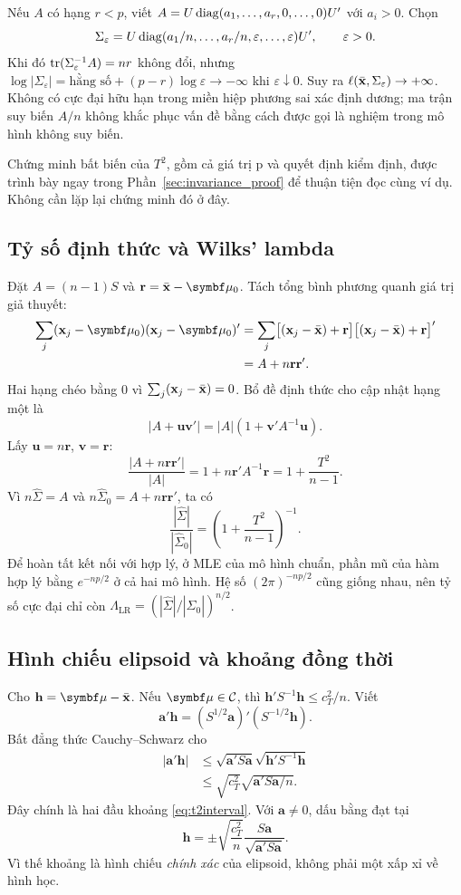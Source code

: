 Nếu $A$ có hạng $r<p$, viết
$A=U\operatorname{diag}(a_1,\ldots,a_r,0,\ldots,0)U'$ với $a_i>0$.
Chọn
\[
 \Sigma_\varepsilon=U\operatorname{diag}(a_1/n,\ldots,a_r/n,
 \varepsilon,\ldots,\varepsilon)U',\qquad\varepsilon>0.
\]
Khi đó $\operatorname{tr}(\Sigma_\varepsilon^{-1}A)=nr$ không đổi, nhưng
$\log|\Sigma_\varepsilon|=\text{hằng số}+(p-r)\log\varepsilon
\to-\infty$ khi $\varepsilon\downarrow0$.
Suy ra $\ell(\bar{\mathbf x},\Sigma_\varepsilon)\to+\infty$.
Không có cực đại hữu hạn trong miền hiệp phương sai xác định dương;
ma trận suy biến $A/n$ không khắc phục vấn đề bằng cách được gọi là
nghiệm trong mô hình không suy biến.

Chứng minh bất biến của $T^2$, gồm cả giá trị p và quyết định kiểm định,
được trình bày ngay trong Phần~\ref{sec:invariance_proof} để thuận tiện
đọc cùng ví dụ. Không cần lặp lại chứng minh đó ở đây.

\subsection{Tỷ số định thức và Wilks' lambda}
Đặt $A=(n-1)S$ và $\mathbf r=\xbar-\vmu_0$. Tách tổng bình phương quanh
giá trị giả thuyết:
\begin{align*}
 \sum_j(\mathbf x_j-\vmu_0)(\mathbf x_j-\vmu_0)'
 &=\sum_j\bigl[(\mathbf x_j-\xbar)+\mathbf r\bigr]
 \bigl[(\mathbf x_j-\xbar)+\mathbf r\bigr]'\\
 &=A+n\mathbf r\mathbf r'.
\end{align*}
Hai hạng chéo bằng 0 vì $\sum_j(\mathbf x_j-\bar{\mathbf x})=0$.
Bổ đề định thức cho cập nhật hạng một là
\[
 |A+\mathbf u\mathbf v'|=|A|(1+\mathbf v'A^{-1}\mathbf u).
\]
Lấy $\mathbf u=n\mathbf r$, $\mathbf v=\mathbf r$:
\[
 \frac{|A+n\mathbf r\mathbf r'|}{|A|}
 =1+n\mathbf r'A^{-1}\mathbf r=1+\frac{T^2}{n-1}.
\]
Vì $n\widehat\Sigma=A$ và $n\widehat\Sigma_0=A+n\mathbf r\mathbf r'$,
ta có
\[
 \frac{|\widehat\Sigma|}{|\widehat\Sigma_0|}
 =\left(1+\frac{T^2}{n-1}\right)^{-1}.
\]
Để hoàn tất kết nối với hợp lý, ở MLE của mô hình chuẩn, phần mũ của hàm
hợp lý bằng $e^{-np/2}$ ở cả hai mô hình. Hệ số $(2\pi)^{-np/2}$ cũng
giống nhau, nên tỷ số cực đại chỉ còn
$\Lambda_{\mathrm{LR}}=(|\widehat\Sigma|/|\widehat\Sigma_0|)^{n/2}$.

\subsection{Hình chiếu elipsoid và khoảng đồng thời}
\label{app:projection}
Cho $\mathbf h=\vmu-\xbar$. Nếu $\vmu\in\mathcal C$, thì
$\mathbf h'S^{-1}\mathbf h\le c_T^2/n$.
Viết
\[
 \mathbf a'\mathbf h=(S^{1/2}\mathbf a)'(S^{-1/2}\mathbf h).
\]
Bất đẳng thức Cauchy--Schwarz cho
\begin{align*}
 |\mathbf a'\mathbf h|
 &\le\sqrt{\mathbf a'S\mathbf a}
 \sqrt{\mathbf h'S^{-1}\mathbf h}\\
 &\le\sqrt{c_T^2}\sqrt{\mathbf a'S\mathbf a/n}.
\end{align*}
Đây chính là hai đầu khoảng \eqref{eq:t2interval}. Với $\mathbf a\ne0$,
dấu bằng đạt tại
\[
 \mathbf h=\pm\sqrt{\frac{c_T^2}{n}}
 \frac{S\mathbf a}{\sqrt{\mathbf a'S\mathbf a}}.
\]
Vì thế khoảng là hình chiếu \emph{chính xác} của elipsoid, không phải
một xấp xỉ về hình học.


